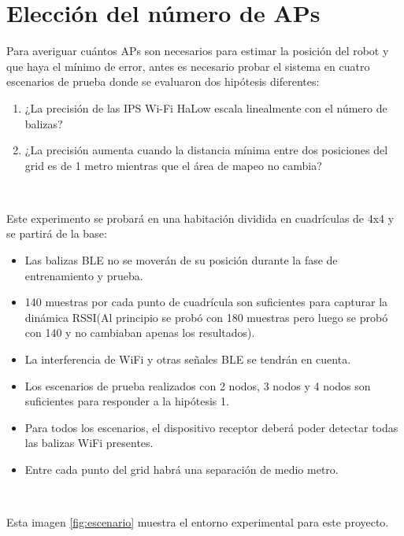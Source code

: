 \section{Elección del número de APs}
\label{sec:num_aps}

Para averiguar cuántos APs son necesarios para estimar la posición del robot y que haya el mínimo de error, antes es necesario probar el sistema en cuatro escenarios de prueba donde se evaluaron dos hipótesis diferentes:

\begin{enumerate}
 \item \textit{} ¿La precisión de las IPS Wi-Fi HaLow escala linealmente con el número de balizas?
 \item \textit{} ¿La precisión aumenta cuando la distancia mínima entre dos posiciones del grid es de 1 metro mientras que el área de mapeo no cambia?
\end{enumerate}\


Este experimento se probará en una habitación dividida en cuadrículas de 4x4 y se partirá de la base:

\begin{itemize}
\item \textit{} Las balizas BLE no se moverán de su posición durante la fase de entrenamiento y prueba.
 \item \textit{} 140 muestras por cada punto de cuadrícula son suficientes para capturar la dinámica RSSI(Al principio se probó con 180 muestras pero luego se probó con 140 y no cambiaban apenas los resultados).
 \item \textit{} La interferencia de WiFi y otras señales BLE se tendrán en cuenta.
 \item \textit{} Los escenarios de prueba realizados con 2 nodos, 3 nodos y 4 nodos son suficientes para responder a la hipótesis 1.
 \item \textit{} Para todos los escenarios, el dispositivo receptor deberá poder detectar todas las balizas WiFi presentes.
 \item \textit{} Entre cada punto del grid habrá una separación de medio metro.
\end{itemize}\


Esta imagen \ref{fig:escenario} muestra el entorno experimental para este proyecto.

